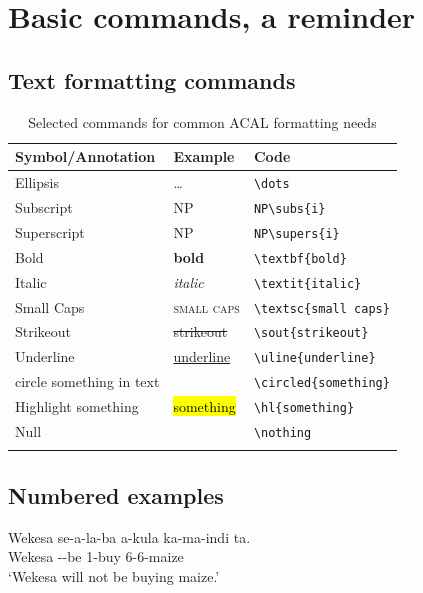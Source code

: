 \documentclass[output=paper,colorlinks,citecolor=brown]{langscibook}
\begin{document}
\section{Basic commands, a reminder}

\subsection{Text formatting commands}

\begin{table}
\caption{Selected commands for common ACAL formatting needs}
\label{tab:diercks:CommandsTable}

\begin{tabular}[t]{l l l}
\lsptoprule		
\textbf{Symbol/Annotation} & \textbf{Example} & \textbf{Code} \\ \midrule
		Ellipsis & \dots & \verb|\dots| \\
		Subscript & NP\subs{i} & \verb|NP\subs{i}| \\
		Superscript & NP\supers{i} & \verb|NP\supers{i}|\\ 
		Bold & \textbf{bold} & \verb|\textbf{bold}| \\
		Italic & \textit{italic} & \verb|\textit{italic}| \\
		Small Caps & \textsc{small caps} & \verb|\textsc{small caps}| \\
		Strikeout & \sout{strikeout} & \verb|\sout{strikeout}| \\
		Underline & \uline{underline} & \verb|\uline{underline}| \\
		circle something in text & \circled{something} & \verb|\circled{something}| \\
		Highlight something & \hl{something} & \verb|\hl{something}| \\
		Null & \nothing  & \verb|\nothing|\\
	\lspbottomrule
	\end{tabular}
\end{table}

\subsection{Numbered examples} \label{sec:diercks:NumberedExs}

\ea \label{ex:diercks:BukusuNegation}
\gll Wekesa se-a-la-ba a-kula ka-ma-indi ta. \\
Wekesa \Sm-\Fut-be 1\Sm-buy 6-6-maize \Neg{} \\ 
\glt `Wekesa will not be buying maize.'
\z
\end{document}
